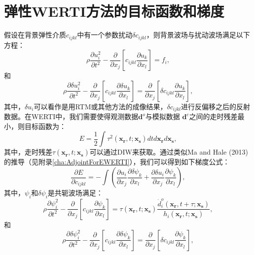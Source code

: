 \section{弹性WERTI方法的目标函数和梯度}
假设在背景弹性介质$c_{ijkl}$中有一个参数扰动$\delta c_{ijkl}$，则背景波场与扰动波场满足以下方程：
\begin{equation}
    \rho \frac{\partial u^2_i}{\partial t^2}  -
    \frac{\partial}{\partial x_j}\left[ 
        c_{ijkl}\frac{\partial u_{k}}{\partial
        x_l}\right]=f_i,
    \label{eq:WE} 
\end{equation}
和
\begin{equation}
    \rho \frac{\partial \delta u^2_i}{\partial t^2}  -
    \frac{\partial}{\partial x_j}\left[ 
        c_{ijkl}\frac{\partial \delta u_{k}}{\partial
        x_l}\right]=\frac{\partial}{\partial x_j}\left[\delta c_{ijkl}\frac{\partial u_{k}}{\partial x_l}\right],
    \label{eq:DeltaWE} 
\end{equation}
其中，$\delta u_i$可以看作是用RTM或其他方法的成像结果，$\delta c_{ijkl}$进行反偏移之后的反射数据。在WERTI中，我们需要使得观测数据$\mathbf{d}^{o}$与模拟数据
$\mathbf{d}^{c}$之间的走时残差最小，则目标函数为：
\begin{equation}
    E=\frac{1}{2}\int\tau^2(\mathbf{x_r},t;\mathbf{x_s})dtd\mathbf{x_r}d\mathbf{x_s},
    \label{eq:Objectivefunction} 
\end{equation}
其中，走时残差$\tau(\mathbf{x_r},t;\mathbf{x_s})$可以通过DIW来获取。通过类似Ma and
Hale (2013)\cite{Ma2013}的推导（见附录\ref{cha:AdjointForEWERTI}），我们可以得到如下梯度公式：
\begin{equation}
    \frac{\partial E}{\partial c_{ijkl}}=-\int (\frac{\partial u_{i}}{\partial
    x_j}\frac{\partial \delta \psi_{k}}{\partial x_l}+\frac{\partial \delta u_{i}}{\partial
    x_j}\frac{\partial \psi_{k}}{\partial x_l}),
    \label{eq:GradientCijkl}
\end{equation}
其中，$\psi_i$和$\delta \psi_i$是共轭波场满足：
\begin{equation}
    \rho \frac{\partial \psi^2_i}{\partial t^2}  -
    \frac{\partial}{\partial x_j}\left[ 
        c_{ijkl}\frac{\partial \psi_{k}}{\partial
        x_l}\right]=\tau(\mathbf{x_r},t;\mathbf{x_s})\frac{\dot{d}^o_i(\mathbf{x_r},t+\tau;\mathbf{x_s})}{h_i(\mathbf{x_r},t;\mathbf{x_s})},
    \label{eq:AdjointWE} 
\end{equation}
和
\begin{equation}
    \rho \frac{\partial \delta \psi^2_i}{\partial t^2}  -
    \frac{\partial}{\partial x_j}\left[ 
        c_{ijkl}\frac{\partial \delta \psi_{k}}{\partial 
        x_l}\right]=\frac{\partial}{\partial x_j}\left[\delta c_{ijkl}\frac{\partial
        \psi_{k}}{\partial x_l}\right], 
    \label{eq:AdjointDeltaWE} 
\end{equation}
